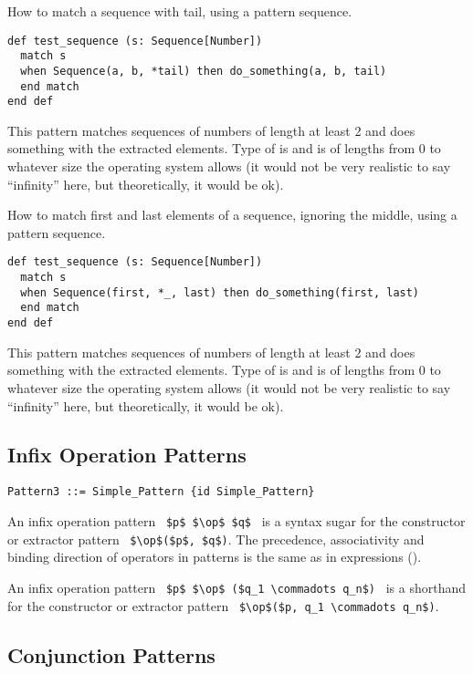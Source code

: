 \example How to match a sequence with tail, using a pattern sequence.
\begin{lstlisting}
def test_sequence (s: Sequence[Number])
  match s 
  when Sequence(a, b, *tail) then do_something(a, b, tail)
  end match
end def
\end{lstlisting}
This pattern matches sequences of numbers of length at least 2 and does something with the extracted elements. Type of  is  and is of lengths from 0 to whatever size the operating system allows (it would not be very realistic to say ``infinity'' here, but theoretically, it would be ok). 

\example How to match first and last elements of a sequence, ignoring the middle, using a pattern sequence.
\begin{lstlisting}
def test_sequence (s: Sequence[Number])
  match s 
  when Sequence(first, *_, last) then do_something(first, last)
  end match
end def
\end{lstlisting}
This pattern matches sequences of numbers of length at least 2 and does something with the extracted elements. Type of  is  and is of lengths from 0 to whatever size the operating system allows (it would not be very realistic to say ``infinity'' here, but theoretically, it would be ok). 





\subsection{Infix Operation Patterns}
\label{sec:infix-operation-patterns}

\syntax\begin{lstlisting}
Pattern3 ::= Simple_Pattern {id Simple_Pattern}
\end{lstlisting}

An infix operation pattern ~\lstinline!$p$ $\op$ $q$!~ is a syntax sugar for the constructor or extractor pattern ~\lstinline!$\op$($p$, $q$)!. The precedence, associativity and binding direction of operators in patterns is the same as in expressions ().

An infix operation pattern ~\lstinline!$p$ $\op$ ($q_1 \commadots q_n$)!~ is a shorthand for the constructor or extractor pattern ~\lstinline!$\op$($p, q_1 \commadots q_n$)!.





\subsection{Conjunction Patterns}
\label{sec:conjunction-patterns}

